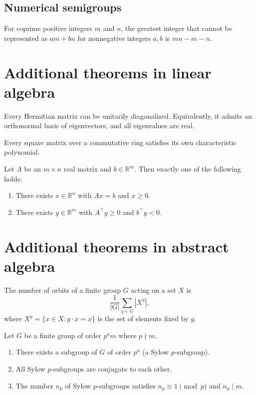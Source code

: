 \documentclass[11pt]{scrartcl}
\providecommand{\RR}{\mathbb R}
\begin{document}
\subsection{Numerical semigroups}
\begin{theorem}
  For coprime positive integers $m$ and $n$,
  the greatest integer that cannot be represented as $am + bn$
  for nonnegative integers $a, b$ is $mn - m - n$.
\end{theorem}


\section{Additional theorems in linear algebra}
\begin{theorem}
  Every Hermitian matrix can be unitarily diagonalized.
  Equivalently, it admits an orthonormal basis of eigenvectors,
  and all eigenvalues are real.
\end{theorem}

\begin{theorem}
  Every square matrix over a commutative ring
  satisfies its own characteristic polynomial.
\end{theorem}

\begin{theorem}
  Let $A$ be an $m \times n$ real matrix and $b \in \RR^m$.
  Then exactly one of the following holds:
  \begin{enumerate}
    \item There exists $x \in \RR^n$ with $Ax = b$ and $x \ge 0$.
    \item There exists $y \in \RR^m$ with $A^\top y \ge 0$ and $b^\top y < 0$.
  \end{enumerate}
\end{theorem}

\section{Additional theorems in abstract algebra}
\begin{theorem}
  The number of orbits of a finite group $G$ acting on a set $X$ is
  \[ \frac{1}{|G|} \sum_{g \in G} |X^g|, \]
  where $X^g = \{x \in X : g \cdot x = x\}$ is the set of elements fixed by $g$.
\end{theorem}

\begin{theorem}
  Let $G$ be a finite group of order $p^a m$ where $p \nmid m$.
  \begin{enumerate}
    \item There exists a subgroup of $G$ of order $p^a$ (a Sylow $p$-subgroup).
    \item All Sylow $p$-subgroups are conjugate to each other.
    \item The number $n_p$ of Sylow $p$-subgroups satisfies
      $n_p \equiv 1 \pmod{p}$ and $n_p \mid m$.
  \end{enumerate}
\end{theorem}
\end{document}
